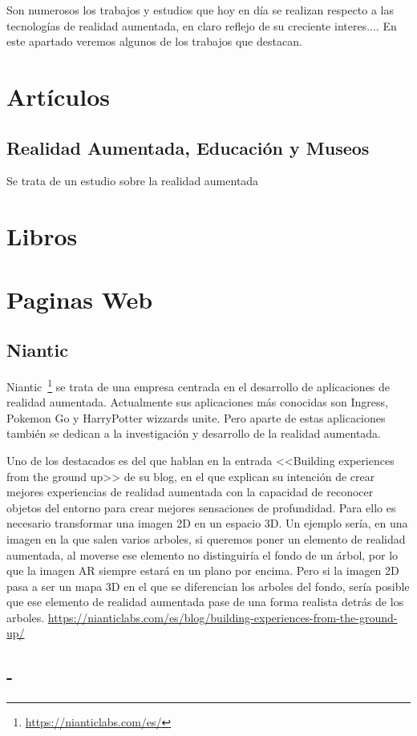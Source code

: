 
Son numerosos los trabajos y estudios que hoy en día se realizan respecto a las tecnologías de realidad aumentada, en claro reflejo de su creciente interes....  En este apartado veremos algunos de los trabajos que destacan.

\section{Artículos}
\subsection{Realidad Aumentada, Educación y Museos}
 
 Se trata de un estudio sobre la realidad aumentada

\section{Libros}

\section{Paginas Web}


\subsection{Niantic}
Niantic~\footnote{\url{https://nianticlabs.com/es/}} se trata de una empresa centrada en el desarrollo de aplicaciones de realidad aumentada. Actualmente sus aplicaciones más conocidas son Ingress, Pokemon Go y HarryPotter wizzards unite.
Pero aparte de estas aplicaciones también se dedican a la investigación y desarrollo de la realidad aumentada.

Uno de los destacados es del que hablan en la entrada <<Building experiences from the ground up>> de su blog, en el que explican su intención de crear mejores experiencias de realidad aumentada con
la capacidad de reconocer objetos del entorno para crear mejores sensaciones de profundidad. Para ello es necesario transformar una imagen 2D en un espacio 3D. Un ejemplo sería, en una imagen en la que salen varios arboles, si queremos poner un elemento de realidad aumentada, al moverse ese elemento no distinguiría el fondo de un árbol, por lo que la imagen AR siempre estará en un plano por encima. Pero si la imagen 2D pasa a ser un mapa 3D en el que se diferencian los arboles del fondo, sería posible que ese elemento de realidad aumentada pase de una forma realista detrás de los arboles. 
\url{https://nianticlabs.com/es/blog/building-experiences-from-the-ground-up/}



\subsection{-}